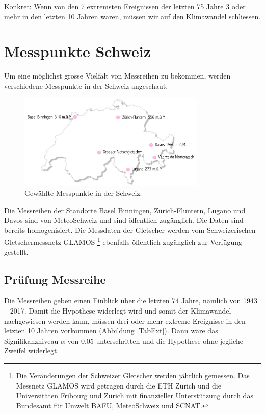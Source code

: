 \begin{refsection}
Konkret: Wenn von den 7 extremsten Ereignissen der letzten 75 Jahre 3 oder mehr in den letzten 10 Jahren waren, müssen wir auf den Klimawandel schliessen.


\section{Messpunkte Schweiz} \label{MesspunkteSchweiz}
Um eine möglichst grosse Vielfalt von Messreihen zu bekommen, werden verschiedene Messpunkte in der Schweiz angeschaut. 

\begin{figure}[htbp]
\centering
\includegraphics[width=0.8\textwidth]{extrem/Schweiz.pdf}
\caption{Gewählte Messpunkte in der Schweiz.}
\label{MesspunkteSchweiz}
\end{figure}

Die Messreihen der Standorte Basel Binningen, Zürich-Fluntern, Lugano und Davos sind von MeteoSchweiz und sind öffentlich zugänglich. Die Daten sind bereits homogenisiert.
Die Messdaten der Gletscher werden vom Schweizerischen Gletschermessnetz GLAMOS \footnote{%
Die Veränderungen der Schweizer Gletscher werden jährlich gemessen. Das Messnetz GLAMOS wird getragen durch die ETH Zürich und die Universitäten Fribourg und Zürich mit finanzieller Unterstützung durch das Bundesamt für Umwelt BAFU, MeteoSchweiz und SCNAT.} ebenfalls öffentlich zugänglich zur Verfügung gestellt.


\subsection{Prüfung Messreihe}
Die Messreihen geben einen Einblick über die letzten 74 Jahre, nämlich von 1943 -- 2017. Damit die Hypothese widerlegt wird und somit der Klimawandel nachgewiesen werden kann, müssen drei oder mehr extreme Ereignisse in den letzten 10 Jahren vorkommen (Abbildung \ref{TabExt}). Dann wäre das Signifikanzniveau $\alpha$ von 0.05 unterschritten und die Hypothese ohne jegliche Zweifel widerlegt.



\end{refsection}
